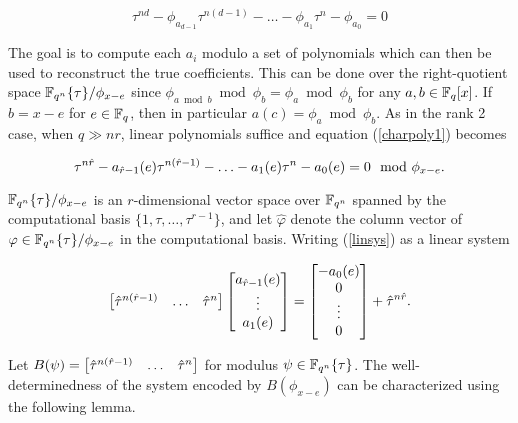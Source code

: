 \begin{equation} \label{charpoly1}
 \tau^{nd} - \phi_{a_{d-1}}\tau^{n(d-1)} - \ldots - \phi_{a_1} \tau^n - \phi_{a_0} = 0
\end{equation}


The goal is to compute each $a_i$ modulo a set of polynomials which can then be used to reconstruct the true coefficients. This can be done over the right-quotient space $\mathbb{F}_{q^n}\{\tau \}/\phi_{x-e}$ since $\phi_{a \bmod b} \bmod \phi_b = \phi_a \bmod \phi_b$ for any $a, b \in \mathbb{F}_q[x]$. If $b = x - e$ for $e \in \mathbb{F}_q$, then in particular $a(c) = \phi_a \bmod \phi_b$. As in the rank 2 case, when $q \gg nr$, linear polynomials suffice and equation (\ref{charpoly1}) becomes

\begin{equation}\label{linsys}
\tau^{n\hat{r}} - a_{\hat{r}-1}(e)\tau^{n(\hat{r}-1)} - \ldots - a_1(e)\tau^n - a_0(e)  = 0 \mod \phi_{x - e}.
\end{equation}

$\mathbb{F}_{q^n}\{\tau \}/\phi_{x-e}$ is an $r$-dimensional vector space over $\mathbb{F}_{q^n}$ spanned by the computational basis $\{1, \tau, \ldots, \tau^{r-1}\}$, and let $\hat{\varphi}$ denote the column vector of $\varphi \in \mathbb{F}_{q^n}\{\tau \}/\phi_{x-e}$ in the computational basis. Writing (\ref{linsys}) as a linear system

\begin{equation}\label{system1} \begin{bmatrix} \hat{\tau}^{n(\hat{r}-1)} & \ldots & \hat{\tau}^{n} \end{bmatrix} \begin{bmatrix} a_{\hat{r}-1}(e) \\ \vdots \\ a_1(e) \end{bmatrix} = \begin{bmatrix}  -a_0(e) \\ 0 \\ \vdots \\ 0  \end{bmatrix} + \hat{\tau}^{n\hat{r}}.
\end{equation}

Let $ B(\psi) = \begin{bmatrix} \hat{\tau}^{n(\hat{r}-1)} & \ldots & \hat{\tau}^{n} \end{bmatrix}$ for modulus $\psi \in \mathbb{F}_{q^n}\{\tau\}$. The well-determinedness of the system encoded by $B(\phi_{x-e})$ can be characterized using the following lemma.


